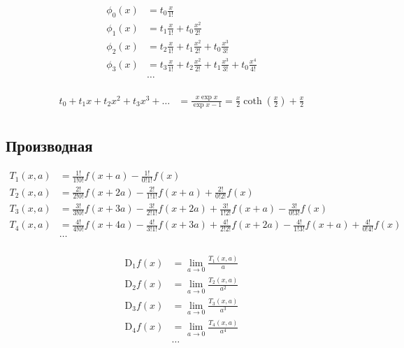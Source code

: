 %
\begin{equation*} \begin{aligned}
\phi_{0}(x) &= 
  t_0 \frac{x}{1!} 
\\
\phi_{1}(x) &= 
  t_1 \frac{x}{1!} 
+ t_0 \frac{x^2}{2!} 
\\
\phi_{2}(x) &= 
  t_2 \frac{x}{1!} 
+ t_1 \frac{x^2}{2!} 
+ t_0 \frac{x^3}{3!} 
\\
\phi_{3}(x) &= 
  t_3 \frac{x}{1!} 
+ t_2 \frac{x^2}{2!} 
+ t_1 \frac{x^3}{3!} 
+ t_0 \frac{x^4}{4!} 
\\
&\ldots
\\
\end{aligned} \end{equation*}

\begin{equation*} \begin{aligned}
  t_0
+ t_1 x
+ t_2 x^2
+ t_3 x^3
+ \ldots
&
= \frac{x \exp{x}}{\exp{x} - 1}
= \frac{x}{2} \coth{\left(\frac{x}{2} \right)} 
+ \frac{x}{2}
\\
\end{aligned} \end{equation*}

\subsection{Производная}

\begin{equation*}
\begin{aligned}
T_1(x,a) &= 
  \frac{1!}{1!0!} f(x + a) 
- \frac{1!}{0!1!} f(x)
\\
T_2(x,a) &= 
  \frac{2!}{2!0!} f(x + 2 a) 
- \frac{2!}{1!1!} f(x + a) 
+ \frac{2!}{0!2!} f(x)
\\
T_3(x,a) &=
  \frac{3!}{3!0!} f(x + 3 a) 
- \frac{3!}{2!1!} f(x + 2 a) 
+ \frac{3!}{1!2!} f(x + a)
- \frac{3!}{0!3!} f(x)
\\
T_4(x,a) &= 
  \frac{4!}{4!0!} f(x + 4 a) 
- \frac{4!}{3!1!} f(x + 3 a) 
+ \frac{4!}{2!2!} f(x + 2 a) 
- \frac{4!}{1!3!} f(x + a) 
+ \frac{4!}{0!4!} f(x)
\\
&\ldots
\\
\end{aligned}
\end{equation*}

\begin{equation*}
\begin{aligned}
\mathrm{D}_1 f(x) &= \lim_{a \to 0} \frac{T_1(x,a)}{a} \\
%
\mathrm{D}_2 f(x) &= \lim_{a \to 0} \frac{T_2(x,a)}{a^2} \\
%
\mathrm{D}_3 f(x) &= \lim_{a \to 0} \frac{T_3(x,a)}{a^3} \\
%
\mathrm{D}_4 f(x) &= \lim_{a \to 0} \frac{T_4(x,a)}{a^4} \\
%
&\ldots \\
\end{aligned}
\end{equation*}

